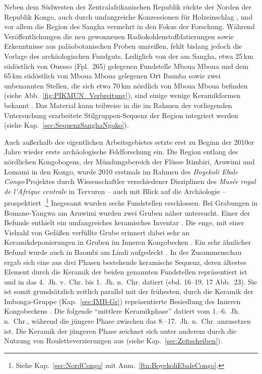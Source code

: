 \begin{multicols}{2}
Neben dem Südwesten der Zentralafrikanischen Republik rückte der Norden der Republik Kongo, auch durch umfangreiche Konzessionen für Holzeinschlag \parencites[siehe][Abb.~S3]{Gond.2013}[166 Abb.~1]{Brandt.2016}, und vor allem die Region des \mbox{Sangha} vermehrt in den Fokus der Forschung. Während Veröffentlichungen die neu gewonnenen Radiokohlenstoffdatierungen \parencite{Oslisly.2013b} sowie Erkenntnisse aus paläobotanischen Proben \parencite{MorinRivat.2014} umreißen, fehlt bislang jedoch die Vorlage des archäologischen Fundguts. Lediglich von der am \mbox{Sangha}, etwa 25\,km südöstlich von Ouesso (Fpl.~265) gelegenen Fundstelle Mboua Mboua und dem 65\,km südöstlich von Mboua Mboua gelegenen Ort Ibamba sowie zwei unbenannten Stellen, die sich etwa 70\,km nördlich von Mboua Mboua befinden (siehe Abb.~\ref{fig:PIKMUN_Verbreitung}), sind einige wenige Keramikformen bekannt \parencite[95 Abb.~31, 114 Abb.~42]{Gillet.2013}. Das Material kann teilweise in die im Rahmen der vorliegenden Untersuchung erarbeitete Stilgruppen-Sequenz der Region integriert werden (siehe Kap.~\ref{sec:SequenzSanghaNgoko}).

Auch außerhalb des eigentlichen Arbeitsgebietes setzte erst zu Beginn der 2010er Jahre wieder erste archäologische Feldforschung ein. Die Region entlang des nördlichen Kongobogens, der Mündungsbereich der Flüsse Itimbiri, Aruwimi und Lomami in den Kongo, wurde 2010 erstmals im Rahmen des \textit{\mbox{Boyekoli} \mbox{Ebale} \mbox{Congo}}-Projektes durch Wissenschaftler verschiedener Disziplinen des \textit{Musée royal de l'Afrique centrale} in Tervuren -- auch mit Blick auf die Archäologie -- prospektiert \parencite{LivingstoneSmith.2011}.\footnote{Siehe Kap.~\ref{sec:NordCongo} mit Anm.~\ref{ftn:BoyekoliEbaleCongo}.} Insgesamt wurden sechs Fundstellen erschlossen. Bei Grabungen in Bomane-Yangwa am Aruwimi wurden zwei Gruben näher untersucht. Einer der Befunde enthielt ein umfangreiches keramisches Inventar \parencite[ebd. 13 Abb. 2; ][5 Abb.~3]{LivingstoneSmith.2017}. Die enge, mit einer Vielzahl von Gefäßen verfüllte Grube erinnert dabei sehr an Keramikdeponierungen in Gruben im Inneren Kongobecken \parencite[siehe][256--264]{Wotzka.1993}. Ein sehr ähnlicher Befund wurde auch in Baombi am Lindi aufgedeckt \parencites[78--79 Abb.~5--6]{Cornelissen.2013}[8 Abb.~10]{LivingstoneSmith.2017}. In der Zusammenschau ergab sich eine aus drei Phasen bestehende keramische Sequenz, deren ältestes Element durch die Keramik der beiden genannten Fundstellen repräsentiert ist und in das 4.~Jh. v.~Chr. bis 1.~Jh. n.~Chr. datiert (ebd. 16--19, 17 Abb.~23). Sie ist somit grundsätzlich zeitlich parallel mit der frühesten, durch die Keramik der Imbonga-Gruppe (Kap.~\ref{sec:IMB-Gr}) repräsentierte Besiedlung des Inneren Kongobeckens \parencite[65]{Wotzka.1995}. Die folgende \enquote{mittlere Keramikphase} datiert vom 1.--6.~Jh. n.~Chr., während die jüngere Phase zwischen das 8.--17.~Jh. n.~Chr. anzusetzen ist. Die Keramik der jüngeren Phase zeichnet sich unter anderem durch die Nutzung von Rouletteverzierungen aus (siehe Kap.~\ref{sec:Zeitscheiben}).


\end{multicols}
